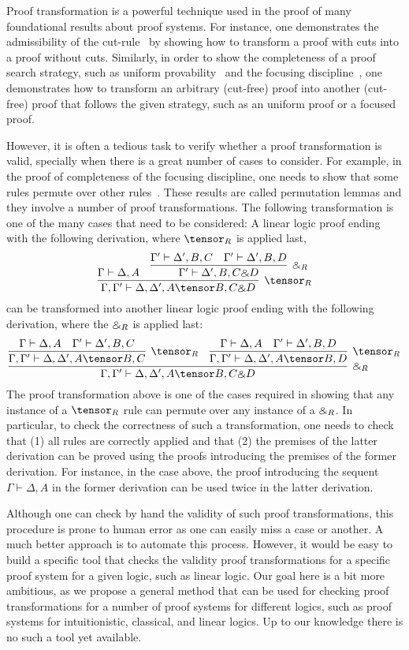 Proof transformation is a powerful technique used in the proof of many
foundational results about proof systems. For instance, one demonstrates
the admissibility of the cut-rule~\cite{gentzen35} by showing
how to transform a proof with cuts into a proof without cuts.
Similarly, in order to show the completeness of a proof search strategy,
such as uniform provability~\cite{miller91apal}  and the focusing
discipline~\cite{andreoli92jlc}, one demonstrates how to transform an
arbitrary (cut-free) proof into another (cut-free) proof that follows the
given strategy, such as an uniform proof or a focused proof. 

However, it is often a tedious task to verify whether a proof
transformation is valid, specially when there is a great number of cases to
consider. For example, in the proof of completeness of the focusing
discipline, one needs to show that some rules permute over other
rules~\cite{miller07cslb}.
These results are called permutation lemmas and they involve
a number of proof transformations. The following transformation is one of
the many cases that need to be considered: A linear logic proof ending with
the following derivation, where $\tensor_R$ is applied last,
{\small
\[
\infer[\tensor_R]{\Gamma, \Gamma' \vdash \Delta, \Delta', A\tensor B,
C\with
D}
{
{\Gamma \vdash \Delta, A}
&
\infer[\with_R]{\Gamma' \vdash \Delta', B, C\with D}
{
{\Gamma' \vdash \Delta', B, C}
&
{\Gamma' \vdash \Delta', B, D}
}
}
\]
}
can be transformed into another linear logic proof ending with the
following
derivation, where the $\binampersand_R$ is applied last:
{\small
\[
\infer[\with_R]{\Gamma, \Gamma' \vdash \Delta, \Delta', A\tensor B, C\with
D}
{
\infer[\tensor_R]{\Gamma, \Gamma' \vdash \Delta, \Delta', A\tensor B, C}
{
{\Gamma \vdash \Delta, A}
&
{\Gamma' \vdash \Delta', B, C}
}
&
\infer[\tensor_R]{\Gamma, \Gamma' \vdash \Delta, \Delta', A\tensor B, D}
{
{\Gamma \vdash \Delta, A}
&
{ \Gamma' \vdash  \Delta', B, D}
}
}
\]
}
The proof transformation above is one of the cases required in showing
that any instance of a $\tensor_R$ rule can permute over any instance
of a $\binampersand_R$. In
particular, to check the correctness of such a transformation, one needs to
check that (1) all rules are correctly applied and that (2) the premises of
the latter derivation can be proved using the proofs introducing the
premises of the former derivation. For instance, in the case above, the
proof introducing the sequent $\Gamma \vdash \Delta, A$ in the former
derivation can be used twice in the latter derivation. 

Although one can check by hand the validity of such proof transformations,
this procedure is prone to human error as one can easily miss a case or
another. A much better approach is to automate this process. However, it
would be easy to build a specific tool that checks the validity
proof transformations for a specific proof system for a given
logic, such as linear logic. Our goal here is a bit more ambitious, as we
propose a general method that can be used for checking proof
transformations for a number of proof systems for different logics, such as
proof systems for intuitionistic, classical, and linear logics. 
Up to our knowledge there is no such a tool yet available.

